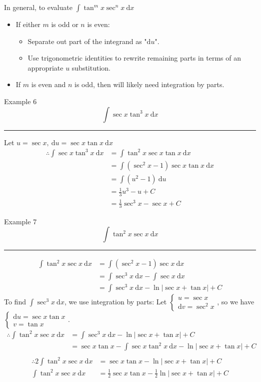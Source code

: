\documentclass[12pt,a4paper]{article}
\def\d{{\mathrm{d}}}
\begin{document}
\begin{thm}{In general, to evaluate $\displaystyle\int\tan^mx\sec^nx\ \d x$}
	\begin{itemize}
		\item If either $m$ is odd or $n$ is even: 
		\begin{itemize}
			\item Separate out part of the integrand as "$\d u$".
			\item Use trigonometric identities to rewrite remaining parts in terms of an appropriate $u$ substitution. 
		\end{itemize}
		\item If $m$ is even and $n$ is odd, then will likely need integration by parts. 
	\end{itemize}
\end{thm}
\begin{eg}{Example 6}
	$$\int\sec{x}\tan^3x\ \d x$$
	\noindent\rule[0.25\baselineskip]{\textwidth}{1pt}
	Let $u=\sec{x},\ \d u=\sec{x}\tan{x}\ \d x$
	$$\begin{aligned}
		\therefore\int\sec{x}\tan^3x\ \d x&=\int\tan^2x\sec{x}\tan{x}\ \d x\\
		&=\int\left(\sec^2{x}-1\right)\sec{x}\tan{x}\ \d x\\
		&=\int\left(u^2-1\right)\ \d u\\
		&=\frac{1}{3}u^3-u+C\\
		&=\frac{1}{3}\sec^3x-\sec{x}+C
	\end{aligned}$$
\end{eg}
\begin{eg}{Example 7}
	$$\int\tan^2x\sec x\ \d x$$
	\noindent\rule[0.25\baselineskip]{\textwidth}{1pt}
	$$\begin{aligned}
		\int\tan^2x\sec{x}\ \d x&=\int\left(\sec^2x-1\right)\sec{x}\ \d x\\
		&=\int\sec^3x\ \d x-\int\sec{x}\ \d x\\
		&=\int\sec^3x\ \d x-\ln\left|\sec{x}+\tan{x}\right|+C
	\end{aligned}$$
	To find $\int\sec^3x\ \d x$, we use integration by parts: Let $\begin{cases}u=\sec{x}\\\d v=\sec^2x\end{cases}$, so we have $\begin{cases}\d u=\sec{x}\tan{x}\\v=\tan{x}\end{cases}$.
	$$\begin{aligned}
		\therefore \boxed{\int\tan^2x\sec{x}\ \d x}&=\int\sec^3x\ \d x-\ln\left|\sec{x}+\tan{x}\right|+C\\
		&=\sec{x}\tan{x}-\boxed{\int\sec{x}\tan^2x\ \d x}-\ln\left|\sec{x}+\tan{x}\right|+C\\
	\end{aligned}$$
	$$\begin{aligned}
		\therefore 2\int\tan^2x\sec{x}\ \d x&=\sec{x}\tan{x}-\ln\left|\sec{x}+\tan{x}\right|+C\\
		\int\tan^2x\sec{x}\ \d x&=\frac{1}{2}\sec{x}\tan{x}-\frac{1}{2}\ln\left|\sec{x}+\tan{x}\right|+C
	\end{aligned}$$
\end{eg}
\end{document}

